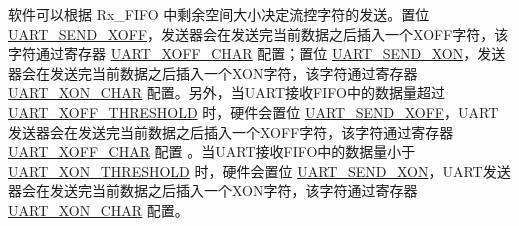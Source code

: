 \documentclass[main\_\_CN.tex]{subfiles}
\begin{document}
软件可以根据 Rx\_FIFO 中剩余空间大小决定流控字符的发送。置位 \hyperref[fielddesc:UARTSENDXOFF]{UART\_SEND\_XOFF}，发送器会在发送完当前数据之后插入一个XOFF字符，该字符通过寄存器 \hyperref[fielddesc:UARTXOFFCHAR]{UART\_XOFF\_CHAR} 配置；置位 \hyperref[fielddesc:UARTSENDXON]{UART\_SEND\_XON}，发送器会在发送完当前数据之后插入一个XON字符，该字符通过寄存器  \hyperref[fielddesc:UARTXONCHAR]{UART\_XON\_CHAR} 配置。另外，当UART接收FIFO中的数据量超过 \hyperref[fielddesc:UARTXOFFTHRESHOLD]{UART\_XOFF\_THRESHOLD} 时，硬件会置位 \hyperref[fielddesc:UARTSENDXOFF]{UART\_SEND\_XOFF}，UART发送器会在发送完当前数据之后插入一个XOFF字符，该字符通过寄存器 \hyperref[fielddesc:UARTXOFFCHAR]{UART\_XOFF\_CHAR} 配置 。当UART接收FIFO中的数据量小于 \hyperref[fielddesc:UARTXONTHRESHOLD]{UART\_XON\_THRESHOLD} 时，硬件会置位 \hyperref[fielddesc:UARTSENDXON]{UART\_SEND\_XON}，UART发送器会在发送完当前数据之后插入一个XON字符，该字符通过寄存器 \hyperref[fielddesc:UARTXONCHAR]{UART\_XON\_CHAR} 配置。
\end{document}
